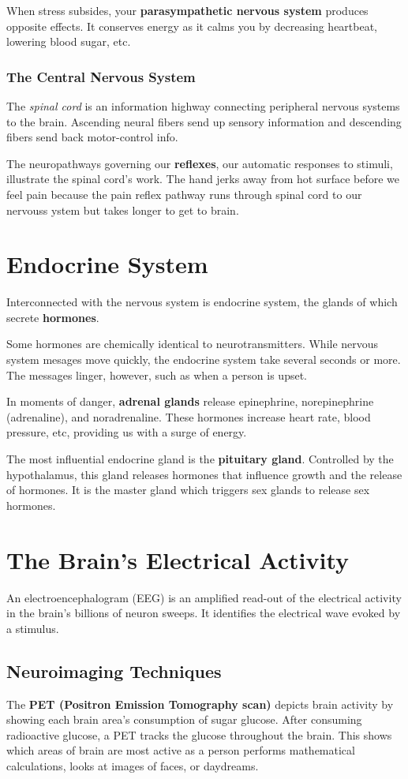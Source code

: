 \documentclass[12pt]{article}
\begin{document}
When stress subsides, your \textbf{parasympathetic nervous system} produces opposite effects. It conserves energy as it calms you by decreasing heartbeat, lowering blood sugar, etc.

\subsubsection*{The Central Nervous System}
The \textit{spinal cord} is an information highway connecting peripheral nervous systems to the brain. Ascending neural fibers send up sensory information and descending fibers send back motor-control info.

The neuropathways governing our \textbf{reflexes}, our automatic responses to stimuli, illustrate the spinal cord's work. The hand jerks away from hot surface before we feel pain because the pain reflex pathway runs through spinal cord to our nervouss ystem but takes longer to get to brain.

\section*{Endocrine System}
Interconnected with the nervous system is endocrine system, the glands of which secrete \textbf{hormones}.

Some hormones are chemically identical to neurotransmitters. While nervous system mesages move quickly, the endocrine system take several seconds or more. The messages linger, however, such as when a person is upset.

In moments of danger, \textbf{adrenal glands} release epinephrine, norepinephrine (adrenaline), and noradrenaline. These hormones increase heart rate, blood pressure, etc, providing us with a surge of energy.

The most influential endocrine gland is the \textbf{pituitary gland}. Controlled by the hypothalamus, this gland releases hormones that influence growth and the release of hormones. It is the master gland which triggers sex glands to release sex hormones.

\section*{The Brain's Electrical Activity}
An electroencephalogram (EEG) is an amplified read-out of the electrical activity in the brain's billions of neuron sweeps. It identifies the electrical wave evoked by a stimulus.

\subsection*{Neuroimaging Techniques}
The \textbf{PET (Positron Emission Tomography scan)} depicts brain activity by showing each brain area's consumption of sugar glucose. After consuming radioactive glucose, a PET tracks the glucose throughout the brain. This shows which areas of brain are most active as a person performs mathematical calculations, looks at images of faces, or daydreams.
\end{document}
